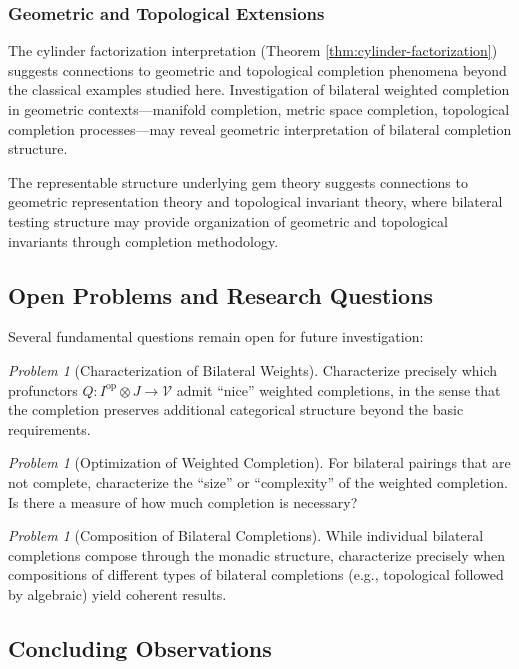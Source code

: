 \documentclass[11pt]{article}
\theoremstyle{plain}
\theoremstyle{definition}
\theoremstyle{remark}
\newtheorem{problem}[theorem]{Problem}
\newcommand{\V}{\mathcal{V}}
\newcommand{\op}{\mathrm{op}}
\begin{document}
\subsubsection{Geometric and Topological Extensions}

The cylinder factorization interpretation (Theorem \ref{thm:cylinder-factorization}) suggests connections to geometric and topological completion phenomena beyond the classical examples studied here. Investigation of bilateral weighted completion in geometric contexts---manifold completion, metric space completion, topological completion processes---may reveal geometric interpretation of bilateral completion structure.

The representable structure underlying gem theory suggests connections to geometric representation theory and topological invariant theory, where bilateral testing structure may provide organization of geometric and topological invariants through completion methodology.

\subsection{Open Problems and Research Questions}

Several fundamental questions remain open for future investigation:

\begin{problem}[Characterization of Bilateral Weights]
Characterize precisely which profunctors $Q : I^{\op} \otimes J \to \V$ admit ``nice'' weighted completions, in the sense that the completion preserves additional categorical structure beyond the basic requirements.
\end{problem}

\begin{problem}[Optimization of Weighted Completion]
For bilateral pairings that are not complete, characterize the ``size'' or ``complexity'' of the weighted completion. Is there a measure of how much completion is necessary?
\end{problem}

\begin{problem}[Composition of Bilateral Completions]
While individual bilateral completions compose through the monadic structure, characterize precisely when compositions of different types of bilateral completions (e.g., topological followed by algebraic) yield coherent results.
\end{problem}

\subsection{Concluding Observations}
\end{document}
